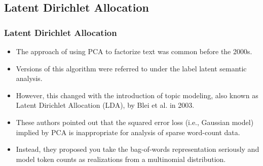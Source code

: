 \documentclass[
  shownotes,
  xcolor={svgnames},
  hyperref={colorlinks,citecolor=DarkBlue,linkcolor=DarkRed,urlcolor=DarkBlue}
  , aspectratio=169]{beamer}
\newcommand{\theme}{\color{andesred}}
\newcommand{\bk}{\color{black}}
\newcommand{\nv}{\color{Navy}}
\newcommand{\bm}[1]{\mathbf{#1}}
\begin{document}

\subsection{Latent Dirichlet Allocation}
\begin{frame}
\frametitle{Latent Dirichlet Allocation}

\begin{itemize}


\item The approach of using PCA to factorize text was common before the 2000s. 
\medskip
\item Versions of this algorithm were referred to under the label latent semantic analysis. 
\medskip
\item However, this changed with the introduction of topic modeling, also known as Latent Dirichlet Allocation (LDA), by Blei et al. in 2003. 
\medskip
\item These authors pointed out that the squared error loss (i.e., Gaussian model) implied by PCA is inappropriate for analysis of sparse word-count data. 
\medskip
\item Instead, they proposed you take the bag-of-words representation seriously and model token counts as realizations from a multinomial distribution. 
\end{itemize}

\end{frame}
\end{document}
